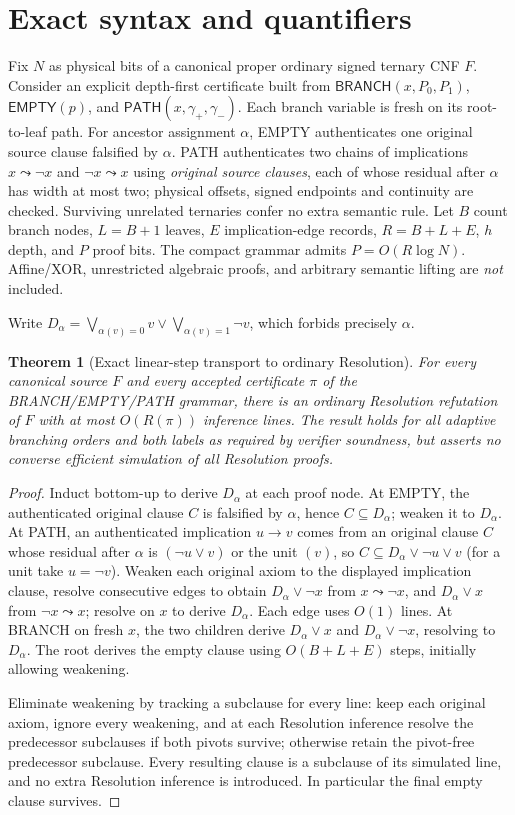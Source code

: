 \documentclass[11pt]{article}
\newtheorem{theorem}{Theorem}
\begin{document}
\section{Exact syntax and quantifiers}
Fix $N$ as physical bits of a canonical proper ordinary signed ternary CNF $F$. Consider an explicit depth-first certificate built from $\mathsf{BRANCH}(x,P_0,P_1)$, $\mathsf{EMPTY}(p)$, and $\mathsf{PATH}(x,\gamma_+,\gamma_-)$. Each branch variable is fresh on its root-to-leaf path. For ancestor assignment $\alpha$, EMPTY authenticates one original source clause falsified by $\alpha$. PATH authenticates two chains of implications $x\leadsto\neg x$ and $\neg x\leadsto x$ using \emph{original source clauses}, each of whose residual after $\alpha$ has width at most two; physical offsets, signed endpoints and continuity are checked. Surviving unrelated ternaries confer no extra semantic rule. Let $B$ count branch nodes, $L=B+1$ leaves, $E$ implication-edge records, $R=B+L+E$, $h$ depth, and $P$ proof bits. The compact grammar admits $P=O(R\log N)$. Affine/XOR, unrestricted algebraic proofs, and arbitrary semantic lifting are \emph{not} included.

Write $D_\alpha=\bigvee_{\alpha(v)=0}v\vee\bigvee_{\alpha(v)=1}\neg v$, which forbids precisely $\alpha$.

\begin{theorem}[Exact linear-step transport to ordinary Resolution]\label{th:transport}
For every canonical source $F$ and every accepted certificate $\pi$ of the BRANCH/EMPTY/PATH grammar, there is an ordinary Resolution refutation of $F$ with at most $O(R(\pi))$ inference lines. The result holds for all adaptive branching orders and both labels as required by verifier soundness, but asserts no converse efficient simulation of all Resolution proofs.
\end{theorem}
\begin{proof}
Induct bottom-up to derive $D_\alpha$ at each proof node. At EMPTY, the authenticated original clause $C$ is falsified by $\alpha$, hence $C\subseteq D_\alpha$; weaken it to $D_\alpha$. At PATH, an authenticated implication $u\to v$ comes from an original clause $C$ whose residual after $\alpha$ is $(\neg u\vee v)$ or the unit $(v)$, so $C\subseteq D_\alpha\vee\neg u\vee v$ (for a unit take $u=\neg v$). Weaken each original axiom to the displayed implication clause, resolve consecutive edges to obtain $D_\alpha\vee\neg x$ from $x\leadsto\neg x$, and $D_\alpha\vee x$ from $\neg x\leadsto x$; resolve on $x$ to derive $D_\alpha$. Each edge uses $O(1)$ lines. At BRANCH on fresh $x$, the two children derive $D_\alpha\vee x$ and $D_\alpha\vee\neg x$, resolving to $D_\alpha$. The root derives the empty clause using $O(B+L+E)$ steps, initially allowing weakening.

Eliminate weakening by tracking a subclause for every line: keep each original axiom, ignore every weakening, and at each Resolution inference resolve the predecessor subclauses if both pivots survive; otherwise retain the pivot-free predecessor subclause. Every resulting clause is a subclause of its simulated line, and no extra Resolution inference is introduced. In particular the final empty clause survives.
\end{proof}
\end{document}
